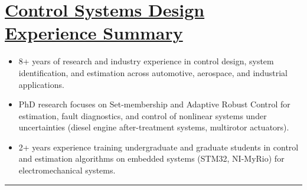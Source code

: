 \section*{\underline{Control Systems Design Experience Summary}}
\begin{itemize}
        \item 8+ years of research and industry experience in control design, system identification, and estimation across automotive, aerospace, and industrial applications.
        \item PhD research focuses on Set-membership and Adaptive Robust Control for estimation, fault diagnostics, and control of nonlinear systems under uncertainties (diesel engine after-treatment systems, multirotor actuators).
        \item 2+ years experience training undergraduate and graduate students in control and estimation algorithms on embedded systems (STM32, NI-MyRio) for electromechanical systems.
\end{itemize}

\noindent\rule{\textwidth}{0.4pt}
